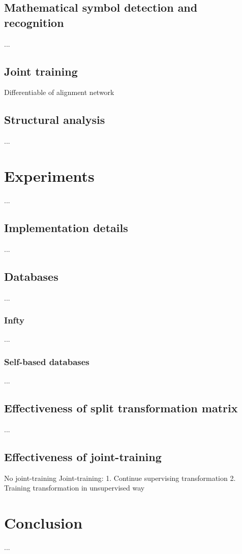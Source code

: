 \documentclass[10pt,conference,a4paper]{IEEEtran}
\begin{document}
	\subsection{Mathematical symbol detection and recognition}	
    ...
	\subsection{Joint training}
	Differentiable of alignment network
	\subsection{Structural analysis}
	...
	\section{Experiments}
	...
	\subsection{Implementation details}
	...
	\subsection{Databases}
	...
	\subsubsection{Infty}
	...
	\subsubsection{Self-based databases}
	...
	\subsection{Effectiveness of split transformation matrix}
	...
	\subsection{Effectiveness of joint-training}
	No joint-training
	Joint-training:
		1. Continue supervising transformation
		2. Training transformation in unsupervised way
	
	
	
	\section{Conclusion}
	...
	
\end{document}
